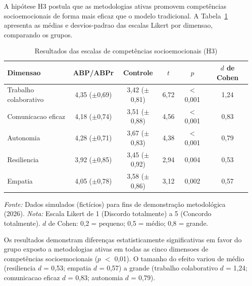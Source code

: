 A hipótese H3 postula que as metodologias ativas promovem competências socioemocionais de forma mais eficaz que o modelo tradicional. A Tabela~\ref{tab:resultado_h3} apresenta as médias e desvios-padrao das escalas Likert por dimensao, comparando os grupos.

\begin{table}[htbp]
    \centering
    \caption{Resultados das escalas de competências socioemocionais (H3)}
    \label{tab:resultado_h3}
    \small
    \begin{tabular}{lccccc}
        \toprule
        \textbf{Dimensao} & \textbf{ABP/ABPr} & \textbf{Controle} & \textbf{$t$} & \textbf{$p$} & \textbf{$d$ de Cohen} \\
        \midrule
        Trabalho colaborativo & 4,35 ($\pm$0,69) & 3,42 ($\pm$0,81) & 6,72 & $<$0,001 & 1,24 \\
        Comunicacao eficaz & 4,18 ($\pm$0,74) & 3,51 ($\pm$0,88) & 4,56 & $<$0,001 & 0,83 \\
        Autonomia & 4,28 ($\pm$0,71) & 3,67 ($\pm$0,83) & 4,38 & $<$0,001 & 0,79 \\
        Resiliencia & 3,92 ($\pm$0,85) & 3,45 ($\pm$0,92) & 2,94 & 0,004 & 0,53 \\
        Empatia & 4,05 ($\pm$0,78) & 3,58 ($\pm$0,86) & 3,12 & 0,002 & 0,57 \\
        \bottomrule
    \end{tabular}
    \par\medskip
    \footnotesize{\textit{Fonte:} Dados simulados (fictícios) para fins de demonstração metodológica (2026). \textit{Nota:} Escala Likert de 1 (Discordo totalmente) a 5 (Concordo totalmente). $d$ de Cohen: 0,2 = pequeno; 0,5 = médio; 0,8 = grande.}
\end{table}

Os resultados demonstram diferenças estatisticamente significativas em favor do grupo exposto a metodologias ativas em todas as cinco dimensoes de competências socioemocionais ($p$ $<$ 0,01). O tamanho do efeito variou de médio (resiliencia $d$ = 0,53; empatia $d$ = 0,57) a grande (trabalho colaborativo $d$ = 1,24; comunicacao eficaz $d$ = 0,83; autonomia $d$ = 0,79).

